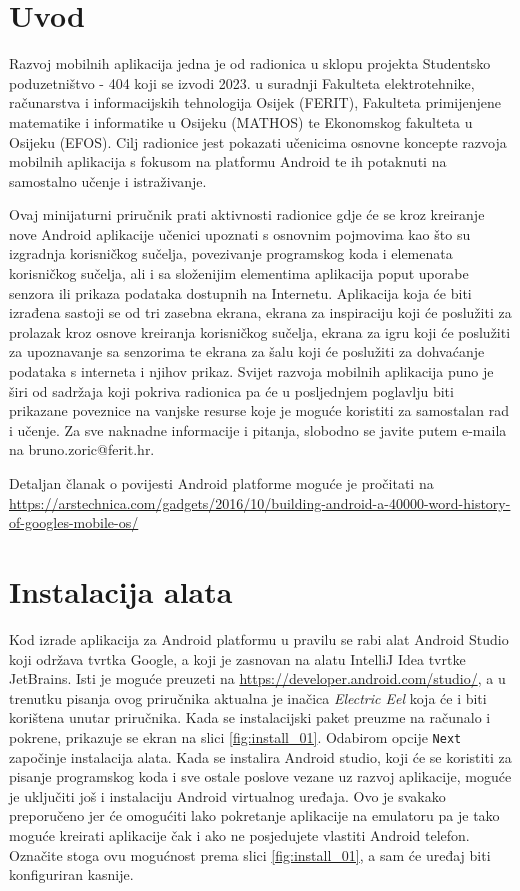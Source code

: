 \documentclass[11pt,a4paper,twoside]{article}
\begin{document}
	
\section{Uvod}

	Razvoj mobilnih aplikacija jedna je od radionica u sklopu projekta Studentsko poduzetništvo - 404 koji se izvodi 2023. u suradnji Fakulteta elektrotehnike, računarstva i informacijskih tehnologija Osijek (FERIT), Fakulteta primijenjene matematike i informatike u Osijeku (MATHOS) te Ekonomskog fakulteta u Osijeku (EFOS). Cilj radionice jest pokazati učenicima osnovne koncepte razvoja mobilnih aplikacija s fokusom na platformu Android te ih potaknuti na samostalno učenje i istraživanje.
	
	Ovaj minijaturni priručnik prati aktivnosti radionice gdje će se kroz kreiranje nove Android aplikacije učenici upoznati s osnovnim pojmovima kao što su izgradnja korisničkog sučelja, povezivanje programskog koda i elemenata korisničkog sučelja, ali i sa složenijim elementima aplikacija poput uporabe senzora ili prikaza podataka dostupnih na Internetu. Aplikacija koja će biti izrađena sastoji se od tri zasebna ekrana, ekrana za inspiraciju koji će poslužiti za prolazak kroz osnove kreiranja korisničkog sučelja, ekrana za igru koji će poslužiti za upoznavanje sa senzorima te ekrana za šalu koji će poslužiti za dohvaćanje podataka s interneta i njihov prikaz. Svijet razvoja mobilnih aplikacija puno je širi od sadržaja koji pokriva radionica pa će u posljednjem poglavlju biti prikazane poveznice na vanjske resurse koje je moguće koristiti za samostalan rad i učenje. Za sve naknadne informacije i pitanja, slobodno se javite putem e-maila na bruno.zoric@ferit.hr.
	
	\begin{infoBox}		
		Detaljan članak o povijesti Android platforme moguće je pročitati na  \url{https://arstechnica.com/gadgets/2016/10/building-android-a-40000-word-history-of-googles-mobile-os/}
	\end{infoBox}
	
\section{Instalacija alata}

	Kod izrade aplikacija za Android platformu u pravilu se rabi alat Android Studio koji održava tvrtka Google, a koji je zasnovan na alatu IntelliJ Idea tvrtke JetBrains. Isti je moguće preuzeti na \url{https://developer.android.com/studio/}, a u trenutku pisanja ovog priručnika aktualna je inačica \textit{Electric Eel} koja će i biti korištena unutar priručnika. Kada se instalacijski paket preuzme na računalo i pokrene, prikazuje se ekran na slici \ref{fig:install_01}. Odabirom opcije \texttt{Next} započinje instalacija alata. 	Kada se instalira Android studio, koji će se koristiti za pisanje programskog koda i sve ostale poslove vezane uz razvoj aplikacije, moguće je uključiti još i instalaciju Android virtualnog uređaja. Ovo je svakako preporučeno jer će omogućiti lako pokretanje aplikacije na emulatoru pa je tako moguće kreirati aplikacije čak i ako ne posjedujete vlastiti Android telefon. Označite stoga ovu mogućnost prema slici \ref{fig:install_01}, a sam će uređaj biti konfiguriran kasnije.
\end{document}
